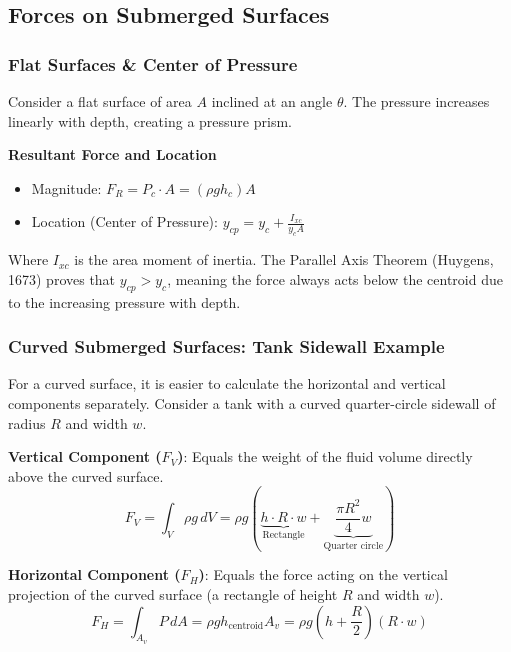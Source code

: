 \subsection{Forces on Submerged Surfaces}

\subsubsection{Flat Surfaces \& Center of Pressure}

Consider a flat surface of area $A$ inclined at an angle $\theta$. The pressure increases linearly with depth, creating a pressure prism.

\textbf{Resultant Force and Location}
\begin{itemize}
    \item Magnitude: $F_{R} = P_{c} \cdot A = (\rho gh_{c})A$
    \item Location (Center of Pressure): $y_{cp} = y_{c} + \frac{I_{xc}}{y_{c}A}$
\end{itemize}

Where $I_{xc}$ is the area moment of inertia. The Parallel Axis Theorem (Huygens, 1673) proves that $y_{cp} > y_{c}$, meaning the force always acts below the centroid due to the increasing pressure with depth.

\subsubsection{Curved Submerged Surfaces: Tank Sidewall Example}

For a curved surface, it is easier to calculate the horizontal and vertical components separately. Consider a tank with a curved quarter-circle sidewall of radius $R$ and width $w$.

\textbf{Vertical Component ($F_{V}$)}: Equals the weight of the fluid volume directly above the curved surface.
\begin{equation*}
    F_{V} = \int_{V} \rho g \, dV = \rho g \left( \underbrace{h \cdot R \cdot w}_{\text{Rectangle}} + \underbrace{\frac{\pi R^{2}}{4}w}_{\text{Quarter circle}} \right)
\end{equation*}

\textbf{Horizontal Component ($F_{H}$)}: Equals the force acting on the vertical projection of the curved surface (a rectangle of height $R$ and width $w$).
\begin{equation*}
    F_{H} = \int_{A_{v}} P \, dA = \rho g h_{\text{centroid}} A_{v} = \rho g \left(h + \frac{R}{2}\right)(R \cdot w)
\end{equation*}

